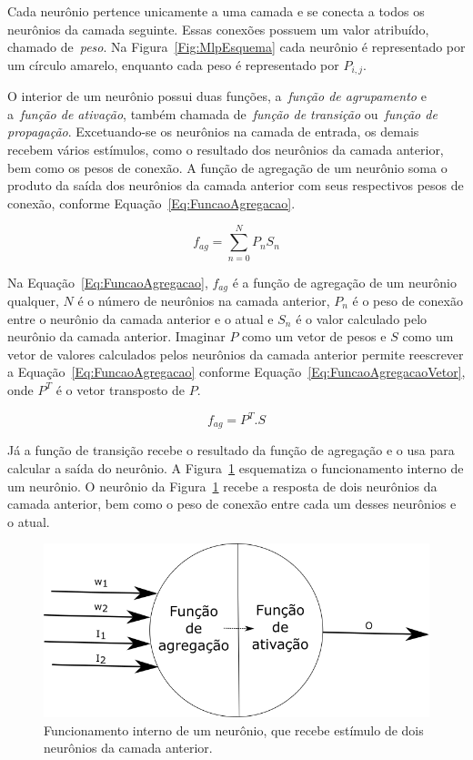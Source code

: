 Cada neurônio pertence unicamente a uma camada e se conecta a todos os neurônios da camada seguinte. Essas conexões possuem um valor atribuído, chamado de~\emph{peso}. Na Figura~\ref{Fig:MlpEsquema} cada neurônio é representado por um círculo amarelo, enquanto cada peso é representado por $P_{i,j}$.

O interior de um neurônio possui duas funções, a~\emph{função de agrupamento} e a~\emph{função de ativação}, também chamada de~\emph{função de transição} ou~\emph{função de propagação}. Excetuando-se os neurônios na camada de entrada, os demais recebem vários estímulos, como o resultado dos neurônios da camada anterior, bem como os pesos de conexão. A função de agregação de um neurônio soma o produto da saída dos neurônios da camada anterior com seus respectivos pesos de conexão, conforme Equação~\ref{Eq:FuncaoAgregacao}.

\begin{equation}
\displaystyle f_{ag} = \sum_{n=0}^{N} P_nS_n
\label{Eq:FuncaoAgregacao}
\end{equation}

Na Equação~\ref{Eq:FuncaoAgregacao}, $f_{ag}$ é a função de agregação de um neurônio qualquer, $N$ é o número de neurônios na camada anterior, $P_n$ é o peso de conexão entre o neurônio da camada anterior e o atual e $S_n$ é o valor calculado pelo neurônio da camada anterior. Imaginar $P$ como um vetor de pesos e $S$ como um vetor de valores calculados pelos neurônios da camada anterior permite reescrever a Equação~\ref{Eq:FuncaoAgregacao} conforme Equação~\ref{Eq:FuncaoAgregacaoVetor}, onde $P^T$ é o vetor transposto de $P$. 

\begin{equation}
\displaystyle f_{ag} = P^T . S
\label{Eq:FuncaoAgregacaoVetor}
\end{equation}

Já a função de transição recebe o resultado da função de agregação e o usa para calcular a saída do neurônio. A Figura~\ref{Fig:NeuronioEsquema} esquematiza o funcionamento interno de um neurônio. O neurônio da Figura~\ref{Fig:NeuronioEsquema} recebe a resposta de dois neurônios da camada anterior, bem como o peso de conexão entre cada um desses neurônios e o atual. 

\begin{figure}[htbp]
  \centering
  \includegraphics[scale=0.5]{images/NeuronioEsquema}
  \caption{Funcionamento interno de um neurônio, que recebe estímulo de dois neurônios da camada anterior.}
    \label{Fig:NeuronioEsquema}
\end{figure}

